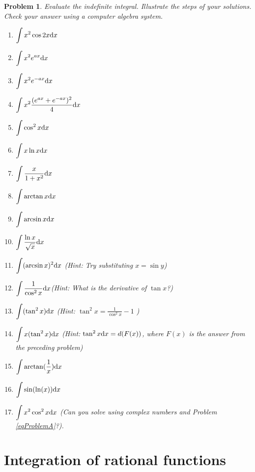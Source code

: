\documentclass[12pt]{book}
\newtheorem{problem}[theorem]{Problem}
\begin{document}
\begin{problem}
Evaluate the indefinite integral. Illustrate the steps of your solutions. Check your answer using a computer algebra system.
\begin{multicols}{2}
\begin{enumerate}
\item
$\displaystyle \int x^2\cos 2x {\normalfont \text{d}} x$
\item
$\displaystyle \int x^2e^{ax}{\normalfont \text{d}} x$
\item
$\displaystyle \int x^2e^{-ax}{\normalfont \text{d}} x$
\item \label{eqProblemA}
$\displaystyle \int x^2\frac{(e^{ax}+e^{-ax})^2}4{\normalfont \text{d}} x$
\item
$\displaystyle \int \cos^2x {\normalfont \text{d}} x$
\item
$\displaystyle \int x\ln x {\normalfont \text{d}} x
$
\item
$\displaystyle \int \frac{x}{1+x^2} {\normalfont \text{d}} x$
\item
$\displaystyle  \int \arctan x {\normalfont \text{d}} x$
\item
$\displaystyle  \int \arcsin x {\normalfont \text{d}} x$
\item
$\displaystyle \int \frac{\ln x}{\sqrt{x}}{\normalfont \text{d}} x $
\item
$\displaystyle \int (\arcsin x)^2 {\normalfont \text{d}} x $ \quad \quad (Hint: Try substituting $x=\sin y$)
\item
$\displaystyle \int \frac{1}{\cos^2 x}{\normalfont \text{d}} x$\quad \quad (Hint: What is the derivative of $\tan x$?)
\item
$\displaystyle \int (\tan^2 x) {\normalfont \text{d}} x $ \quad \quad (Hint: $\tan^2 x = \frac{1}{\cos^2x }-1$ )
\item
$\displaystyle \int x(\tan^2 x) {\normalfont \text{d}} x $ \quad \quad (Hint: $\tan^2 x {\normalfont \text{d}} x= d(F(x))$, where $F(x)$ is the answer from the preceding problem)
\item
$\displaystyle \int\arctan (\frac{1}x){\normalfont \text{d}} x$
\item
$\displaystyle \int \sin (\ln (x)) {\normalfont \text{d}} x $
\item
$\displaystyle \int x^2\cos^2x {\normalfont \text{d}} x$ (Can you solve using complex numbers and Problem \ref{eqProblemA}?).
\end{enumerate}
\end{multicols}
\end{problem}

\section{Integration of rational functions}\label{secIntegrationRationalFunctions}
\end{document}
